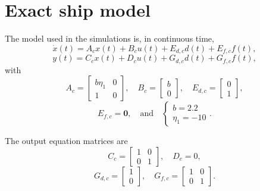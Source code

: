\appendices
\section{Exact ship model}
\label{appendix:exact_model}

The model used in the simulations is, in continuous time,
\begin{equation}
    \dot{x}(t) = A_c x(t) + B_c u(t) + E_{d,c} d(t) + E_{f,c} f(t),
\end{equation}
\begin{equation}
    y(t) = C_c x(t) + D_c u(t) + G_{d,c} d(t) + G_{f,c} f(t),
\end{equation}
with
\begin{equation}
    A_c = \begin{bmatrix}
        b\eta_1 & 0 \\
        1 & 0
    \end{bmatrix},
    \quad
    B_c = \begin{bmatrix}
        b \\
        0
    \end{bmatrix},
    \quad
    E_{d,c} = \begin{bmatrix}
        0 \\
        1
    \end{bmatrix},
\end{equation}
\begin{equation}
    E_{f,c} = \mathbf{0}, \quad \text{and} \quad \begin{cases}
        b = 2.2\\
        \eta_1 = -10
    \end{cases}.
\end{equation}

The output equation matrices are
\begin{equation}
    C_c = \begin{bmatrix}
        1 & 0 \\
        0 & 1
    \end{bmatrix},
    \quad
    D_c = 0,
\end{equation}
\begin{equation}
    G_{d,c} = \begin{bmatrix}
        1 \\
        0
    \end{bmatrix},
    \quad
    G_{f,c} = \begin{bmatrix}
        1 & 0 \\
        0 & 1
    \end{bmatrix}.
\end{equation}

